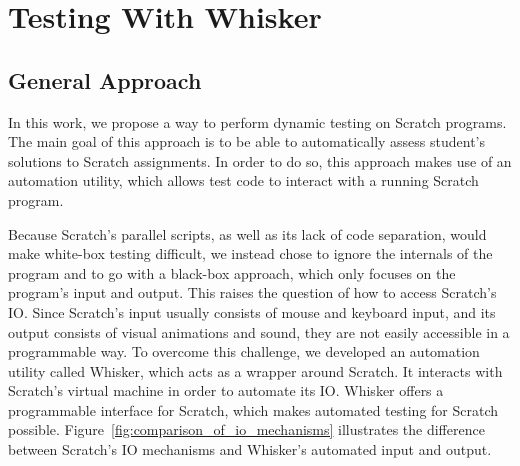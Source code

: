 
\chapter{Testing With Whisker}
\label{cha:appraoch}


\section{General Approach}
\label{sec:general_appraoch}

In this work, we propose a way to perform dynamic testing on Scratch programs.
The main goal of this approach is to be able to automatically assess student's solutions to Scratch assignments.
In order to do so, this approach makes use of an automation utility, which allows test code to interact with a running Scratch program.
\parspace

Because Scratch's parallel scripts, as well as its lack of code separation, would make white-box testing difficult,
we instead chose to ignore the internals of the program and to go with a black-box approach, which only focuses on the program's input and output.
This raises the question of how to access Scratch's IO.
Since Scratch's input usually consists of mouse and keyboard input, and its output consists of visual animations and sound,
they are not easily accessible in a programmable way.
To overcome this challenge, we developed an automation utility called Whisker, which acts as a wrapper around Scratch.
It interacts with Scratch's virtual machine in order to automate its IO.
Whisker offers a programmable interface for Scratch, which makes automated testing for Scratch possible.
Figure~\ref{fig:comparison_of_io_mechanisms} illustrates the difference between Scratch's IO mechanisms and Whisker's automated input and output.

